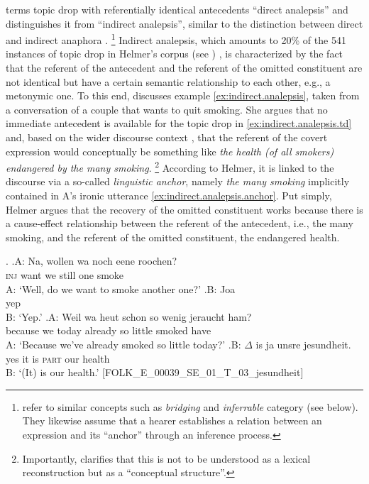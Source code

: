 \citet[76]{helmer2016} terms topic drop with referentially identical antecedents ``direct analepsis'' and distinguishes it from ``indirect analepsis'', similar to the distinction between direct and indirect anaphora \citep[e.g.,][284--286]{consten.schwarz-friesel2007}.%
\footnote{\citet[284]{consten.schwarz-friesel2007} refer to similar concepts such as  \textit{bridging} and  \textit{inferrable} category (see below).
They likewise assume that a hearer establishes a relation between an expression and its ``anchor'' through an inference process.}
%
Indirect analepsis, which amounts to 20\% of the 541 instances of topic drop in Helmer's corpus  (see ) \citep[74]{helmer2016}, is characterized by the fact that the referent of the antecedent and the referent of the omitted constituent are not identical but have a certain semantic relationship to each other, e.g., a metonymic one.
To this end, \citet{helmer2016} discusses example \ref{ex:indirect.analepsis}, taken from a conversation of a couple that wants to quit smoking. 
She argues that no immediate antecedent is available for the topic drop in \ref{ex:indirect.analepsis.td} and, based on the wider discourse context \citep[see][88--89, for details]{helmer2016}, that the referent of the covert expression would conceptually be something like \textit{the health (of all smokers) endangered by the many smoking}.%
\footnote{Importantly, \citet[89, footnote 71]{helmer2016} clarifies that this is not to be understood as a lexical reconstruction but as a ``conceptual structure''.}
%
According to Helmer, it is linked to the discourse via a so-called \textit{linguistic anchor}, namely \textit{the many smoking} implicitly contained in A's ironic utterance \ref{ex:indirect.analepsis.anchor}.
Put simply, Helmer argues that the recovery of the omitted constituent works because there is a cause-effect relationship between the referent of the antecedent, i.e., the many smoking, and the referent of the omitted constituent, the endangered health.

\ex.\label{ex:indirect.analepsis}
\ag.A: Na, wollen wa noch eene roochen?\\
{} \textsc{inj} want we still one smoke\\
A: `Well, do we want to smoke another one?'
\bg.B: Joa\\
{} yep\\
B: `Yep.'
\cg.\label{ex:indirect.analepsis.anchor}A: Weil wa heut schon so wenig jeraucht ham?\\
{} because we today already so little smoked have\\
A: `Because we've already smoked so little today?'
\dg.\label{ex:indirect.analepsis.td}B: $\Delta$ is ja unsre jesundheit.\\
{}yes it is \textsc{part} our health\\
B: `(It) is our health.' [FOLK\_E\_00039\_SE\_01\_T\_03\_jesundheit] \citep[cited in][88, simplified]{helmer2016}

